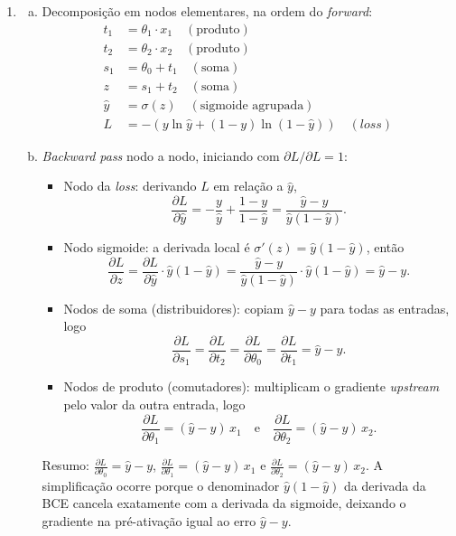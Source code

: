 \documentclass{dlproblemset}
\begin{document}
\begin{enumerate}[1)]
    \item
    \begin{enumerate}[a)]
        \item Decomposição em nodos elementares, na ordem do \textit{forward}:
        \begin{align*}
            t_1 &= \theta_1 \cdot x_1 \quad (\text{produto})\\
            t_2 &= \theta_2 \cdot x_2 \quad (\text{produto})\\
            s_1 &= \theta_0 + t_1 \quad (\text{soma})\\
            z &= s_1 + t_2 \quad (\text{soma})\\
            \hat{y} &= \sigma(z) \quad (\text{sigmoide agrupada})\\
            L &= -\left(y\ln\hat{y} + (1-y)\ln(1-\hat{y})\right) \quad (\textit{loss})
        \end{align*}
        \item \textit{Backward pass} nodo a nodo, iniciando com $\partial L/\partial L = 1$:
        \begin{itemize}
            \item Nodo da \textit{loss}: derivando $L$ em relação a $\hat{y}$,
            $$\frac{\partial L}{\partial \hat{y}} = -\frac{y}{\hat{y}} + \frac{1-y}{1-\hat{y}} = \frac{\hat{y} - y}{\hat{y}(1-\hat{y})}.$$
            \item Nodo sigmoide: a derivada local é $\sigma'(z) = \hat{y}(1-\hat{y})$, então
            $$\frac{\partial L}{\partial z} = \frac{\partial L}{\partial \hat{y}} \cdot \hat{y}(1-\hat{y}) = \frac{\hat{y} - y}{\hat{y}(1-\hat{y})} \cdot \hat{y}(1-\hat{y}) = \hat{y} - y.$$
            \item Nodos de soma (distribuidores): copiam $\hat{y} - y$ para todas as entradas, logo
            $$\frac{\partial L}{\partial s_1} = \frac{\partial L}{\partial t_2} = \frac{\partial L}{\partial \theta_0} = \frac{\partial L}{\partial t_1} = \hat{y} - y.$$
            \item Nodos de produto (comutadores): multiplicam o gradiente \textit{upstream} pelo valor da outra entrada, logo
            $$\frac{\partial L}{\partial \theta_1} = (\hat{y} - y)\,x_1 \quad \text{e} \quad \frac{\partial L}{\partial \theta_2} = (\hat{y} - y)\,x_2.$$
        \end{itemize}
        Resumo: $\frac{\partial L}{\partial \theta_0} = \hat{y} - y$, $\frac{\partial L}{\partial \theta_1} = (\hat{y} - y)\,x_1$ e $\frac{\partial L}{\partial \theta_2} = (\hat{y} - y)\,x_2$. A simplificação ocorre porque o denominador $\hat{y}(1-\hat{y})$ da derivada da BCE cancela exatamente com a derivada da sigmoide, deixando o gradiente na pré-ativação igual ao erro $\hat{y} - y$.
    \end{enumerate}


\end{enumerate}
\end{document}
